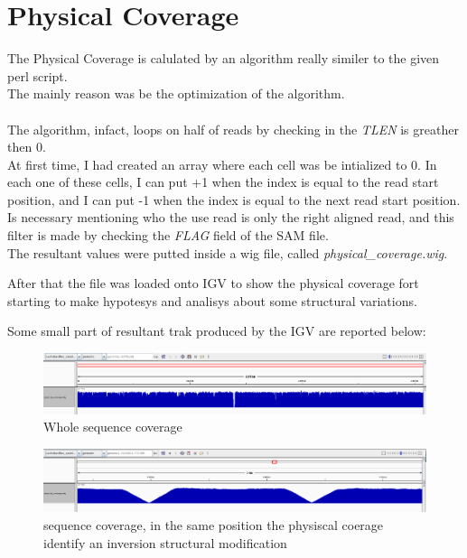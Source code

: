 \section{Physical Coverage}

The Physical Coverage is calulated by an algorithm really similer to the given perl script.\\

The mainly reason was be the optimization of the algorithm.\\\\

The algorithm, infact, loops on half of reads by checking in the \emph{TLEN} is greather then 0.\\
At first time, I had created an array where each cell was be intialized to 0. 
In each one of these cells, I can put +1 when the index is equal to the read start position, and I can put -1 when the index is equal to the next read start position.\\

Is necessary mentioning who the use read is only the right aligned read, and this filter is made by checking the \emph{FLAG} field of the SAM file.
\\
The resultant values were putted inside a wig file, called \emph{physical\_coverage.wig}.

After that the file was loaded onto IGV to show the physical coverage fort starting to make hypotesys and analisys about some structural variations.

Some small part of resultant trak produced by the IGV are reported below:

 \begin{figure}[H]
				\centering
				\includegraphics[scale=0.6]{immagini/physical_coverage_1.png}
				\caption{Whole sequence coverage}\label{fig:6}
				\end{figure}


 \begin{figure}[H]
				\centering
				\includegraphics[scale=0.6]{immagini/physical_coverage_2.png}
				\caption{sequence coverage, in the same position the physiscal coerage identify an inversion structural modification}\label{fig:7}
				\end{figure}
				
